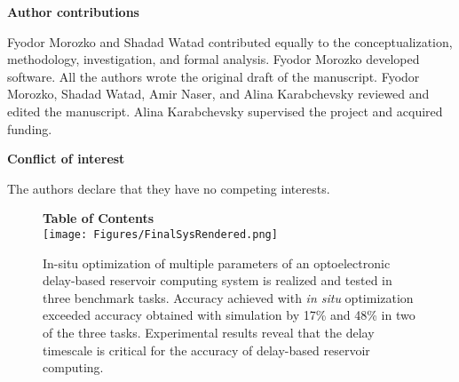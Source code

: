 \documentclass{WileyMSP-template}
\begin{document}
\medskip
\textbf{Author contributions} \par
Fyodor Morozko and Shadad Watad contributed equally to the conceptualization, methodology, investigation, and formal analysis. Fyodor Morozko developed software. All the authors wrote the original draft of the manuscript. Fyodor Morozko, Shadad Watad, Amir Naser, and Alina Karabchevsky reviewed and edited the manuscript. Alina Karabchevsky supervised the project and acquired funding.

\medskip
\textbf{Conflict of interest} \par
The authors declare that they have no competing interests.


\medskip







\FloatBarrier

\begin{figure}
\textbf{Table of Contents}\\
\medskip
  \texttt{[image: Figures/FinalSysRendered.png]}
  \medskip
  \caption*{
    In-situ optimization of multiple parameters of an optoelectronic delay-based reservoir computing system is realized and tested in three benchmark tasks.
    Accuracy achieved with \emph{in situ} optimization exceeded accuracy obtained with simulation by 17\% and 48\% in two of the three tasks.
    Experimental results reveal that the delay timescale is critical for the accuracy of delay-based reservoir computing.
  }
\end{figure}
\end{document}
